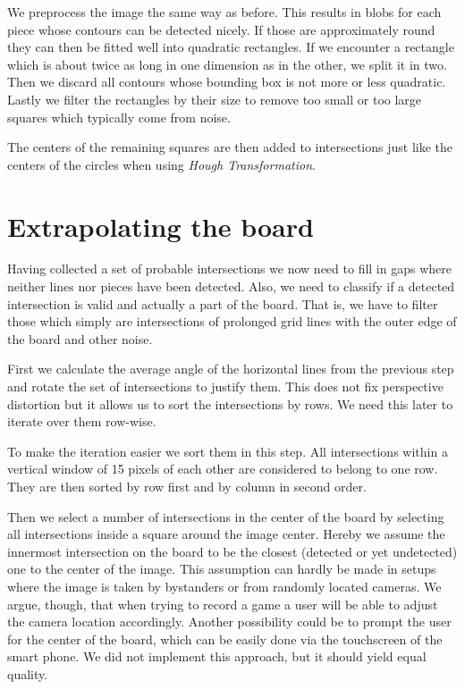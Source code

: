 	We preprocess the image the same way as before. This results in blobs for each piece whose contours can be detected nicely. If those are approximately round they can then be fitted well into quadratic rectangles. If we encounter a rectangle which is about twice as long in one dimension as in the other, we split it in two. Then we discard all contours whose bounding box is not more or less quadratic. Lastly we filter the rectangles by their size to remove too small or too large squares which typically come from noise.

	The centers of the remaining squares are then added to intersections just like the centers of the circles when using \emph{Hough Transformation}.

	\section{Extrapolating the board}
	\label{detector-calculate}
	Having collected a set of probable intersections we now need to fill in gaps where neither lines nor pieces have been detected. Also, we need to classify if a detected intersection is valid and actually a part of the board. That is, we have to filter those which simply are intersections of prolonged grid lines with the outer edge of the board and other noise.

	First we calculate the average angle of the horizontal lines from the previous step and rotate the set of intersections to justify them. This does not fix perspective distortion but it allows us to sort the intersections by rows. We need this later to iterate over them row-wise.

	To make the iteration easier we sort them in this step. All intersections within a vertical window of 15 pixels of each other are considered to belong to one row. They are then sorted by row first and by column in second order.

	Then we select a number of intersections in the center of the board by selecting all intersections inside a square around the image center. Hereby we assume the innermost intersection on the board to be the closest (detected or yet undetected) one to the center of the image. This assumption can hardly be made in setups where the image is taken by bystanders or from randomly located cameras. We argue, though, that when trying to record a game a user will be able to adjust the camera location accordingly. Another possibility could be to prompt the user for the center of the board, which can be easily done via the touchscreen of the smart phone. We did not implement this approach, but it should yield equal quality.

